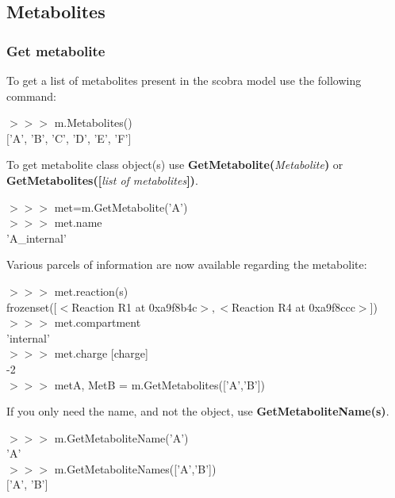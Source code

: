 \subsection{Metabolites}

\subsubsection{Get metabolite}

To get a list of metabolites present in the scobra model use the following command:
\begin{framed}
$>>>$ m.Metabolites()\\
$[$'A', 'B', 'C', 'D', 'E', 'F'$]$
\end{framed}

To get metabolite class object(s) use \textbf{GetMetabolite(}\textit{Metabolite}\textbf{)} or \textbf{GetMetabolites([}\textit{list of metabolites}\textbf{])}.

\begin{framed}
$>>>$ met=m.GetMetabolite('A')\\
$>>>$ met.name\\
'A\_internal'
\end{framed}

Various parcels of information are now available regarding the metabolite:

\begin{framed}
$>>>$ met.reaction(s)\\
frozenset([$<$Reaction R1 at 0xa9f8b4c$>, <$Reaction R4 at 0xa9f8ccc$>$])\\

$>>>$ met.compartment\\
'internal'\\

$>>>$ met.charge [charge]\\
-2\\

$>>>$ metA, MetB = m.GetMetabolites(['A','B'])
\end{framed}

If you only need the name, and not the object, use \textbf{GetMetaboliteName(s)}.

\begin{framed}
$>>>$ m.GetMetaboliteName('A')\\
'A'\\

$>>>$ m.GetMetaboliteNames(['A','B'])\\
$[$'A', 'B'$]$
\end{framed}


